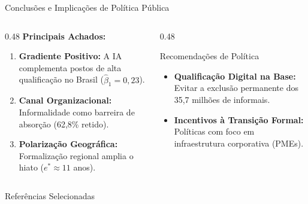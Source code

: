 \documentclass[aspectratio=169, 10pt]{beamer}
\begin{document}
\begin{frame}{Conclusões e Implicações de Política Pública}
    \begin{columns}[T]
        \begin{column}{0.48\textwidth}
            \textbf{Principais Achados:}
            \begin{enumerate}
                \item \textbf{Gradiente Positivo:} A IA complementa postos de
                alta qualificação no Brasil ($\hat{\beta}_1 = 0{,}23$).
                \item \textbf{Canal Organizacional:} Informalidade como barreira
                de absorção (62,8\% retido).
                \item \textbf{Polarização Geográfica:} Formalização regional
                amplia o hiato ($e^* \approx 11$ anos).
            \end{enumerate}
        \end{column}

        \begin{column}{0.48\textwidth}
            \begin{block}{Recomendações de Política}
                \begin{itemize}
                    \item \textbf{Qualificação Digital na Base:} Evitar a
                    exclusão permanente dos 35,7 milhões de informais.
                    \item \textbf{Incentivos à Transição Formal:} Políticas
                    com foco em infraestrutura corporativa (PMEs).
                \end{itemize}
            \end{block}
        \end{column}
    \end{columns}
\end{frame}

\begin{frame}{Referências Selecionadas}
    \footnotesize
    
    
\end{frame}
\end{document}
